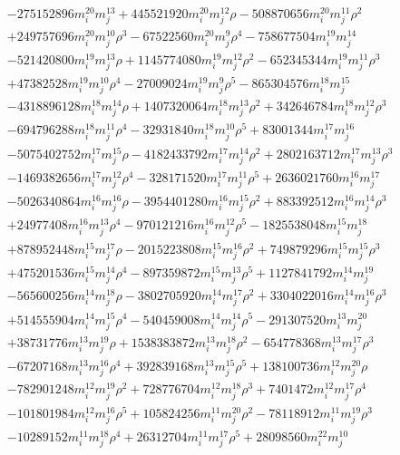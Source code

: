 {\begin{align*}
&-275152896m_i^{20}m_j^{13}+445521920m_i^{20}m_j^{12}\rho-508870656m_i^{20}m_j^{11}\rho^{2}\\
&+249757696m_i^{20}m_j^{10}\rho^{3}-67522560m_i^{20}m_j^{9}\rho^{4}-758677504m_i^{19}m_j^{14}\\
&-521420800m_i^{19}m_j^{13}\rho+1145774080m_i^{19}m_j^{12}\rho^{2}-652345344m_i^{19}m_j^{11}\rho^{3}\\
&+47382528m_i^{19}m_j^{10}\rho^{4}-27009024m_i^{19}m_j^{9}\rho^{5}-865304576m_i^{18}m_j^{15}\\
&-4318896128m_i^{18}m_j^{14}\rho+1407320064m_i^{18}m_j^{13}\rho^{2}+342646784m_i^{18}m_j^{12}\rho^{3}\\
&-694796288m_i^{18}m_j^{11}\rho^{4}-32931840m_i^{18}m_j^{10}\rho^{5}+83001344m_i^{17}m_j^{16}\\
&-5075402752m_i^{17}m_j^{15}\rho-4182433792m_i^{17}m_j^{14}\rho^{2}+2802163712m_i^{17}m_j^{13}\rho^{3}\\
&-1469382656m_i^{17}m_j^{12}\rho^{4}-328171520m_i^{17}m_j^{11}\rho^{5}+2636021760m_i^{16}m_j^{17}\\
&-5026340864m_i^{16}m_j^{16}\rho-3954401280m_i^{16}m_j^{15}\rho^{2}+883392512m_i^{16}m_j^{14}\rho^{3}\\
&+24977408m_i^{16}m_j^{13}\rho^{4}-970121216m_i^{16}m_j^{12}\rho^{5}-1825538048m_i^{15}m_j^{18}\\
&+878952448m_i^{15}m_j^{17}\rho-2015223808m_i^{15}m_j^{16}\rho^{2}+749879296m_i^{15}m_j^{15}\rho^{3}\\
&+475201536m_i^{15}m_j^{14}\rho^{4}-897359872m_i^{15}m_j^{13}\rho^{5}+1127841792m_i^{14}m_j^{19}\\
&-565600256m_i^{14}m_j^{18}\rho-3802705920m_i^{14}m_j^{17}\rho^{2}+3304022016m_i^{14}m_j^{16}\rho^{3}\\
&+514555904m_i^{14}m_j^{15}\rho^{4}-540459008m_i^{14}m_j^{14}\rho^{5}-291307520m_i^{13}m_j^{20}\\
&+38731776m_i^{13}m_j^{19}\rho+1538383872m_i^{13}m_j^{18}\rho^{2}-654778368m_i^{13}m_j^{17}\rho^{3}\\
&-67207168m_i^{13}m_j^{16}\rho^{4}+392839168m_i^{13}m_j^{15}\rho^{5}+138100736m_i^{12}m_j^{20}\rho\\
&-782901248m_i^{12}m_j^{19}\rho^{2}+728776704m_i^{12}m_j^{18}\rho^{3}+7401472m_i^{12}m_j^{17}\rho^{4}\\
&-101801984m_i^{12}m_j^{16}\rho^{5}+105824256m_i^{11}m_j^{20}\rho^{2}-78118912m_i^{11}m_j^{19}\rho^{3}\\
&-10289152m_i^{11}m_j^{18}\rho^{4}+26312704m_i^{11}m_j^{17}\rho^{5}+28098560m_i^{22}m_j^{10}\\

\end{align*}}
